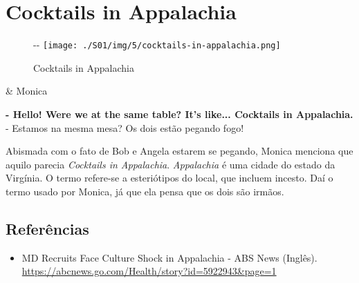 \hypertarget{cocktails-in-appalachia}{%
\section{Cocktails in Appalachia}\label{cocktails-in-appalachia}}

\begin{figure}[!ht]
  \begin{adjustwidth}{-\oddsidemargin-1in}{-\rightmargin}
    \centering
    \texttt{[image: ./S01/img/5/cocktails-in-appalachia.png]}
    \caption{Cocktails in Appalachia\label{fig:cocktails-in-appalachia}}
  \end{adjustwidth}
\end{figure}

\begin{tcolorbox}[enhanced,center upper,
    drop fuzzy shadow southeast, boxrule=0.3pt,
    lower separated=false,
    colframe=black!30!dialogoBorder,colback=white]
\begin{minipage}[c]{0.14\linewidth}
   & \centering \scriptsize{Monica}
\end{minipage}
\hspace{.1mm}
\begin{minipage}[c]{0.8\linewidth}
  \textbf{- Hello! Were we at the same table? It's like... Cocktails in Appalachia.}\\
  - Estamos na mesma mesa? Os dois estão pegando fogo!
\end{minipage}
\end{tcolorbox}

Abismada com o fato de Bob e Angela estarem se pegando, Monica menciona
que aquilo parecia \emph{Cocktails in Appalachia}. \emph{Appalachia} é
uma cidade do estado da Virgínia. O termo refere-se a esteriótipos do
local, que incluem incesto. Daí o termo usado por Monica, já que ela
pensa que os dois são irmãos.

\hypertarget{referuxeancias-2}{%
\subsection{Referências}\label{referuxeancias-2}}

\begin{itemize}
\tightlist
\item
  \sloppy MD Recruits Face Culture Shock in Appalachia - ABS News (Inglês). \url{https://abcnews.go.com/Health/story?id=5922943&page=1}
\end{itemize}
